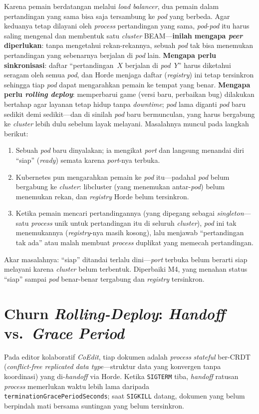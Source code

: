 Karena pemain berdatangan melalui \emph{load balancer}, dua pemain dalam pertandingan yang
sama bisa saja tersambung ke \emph{pod} yang berbeda. Agar keduanya tetap dilayani oleh
\emph{process} pertandingan yang sama, \emph{pod}-\emph{pod} itu harus saling mengenal dan
membentuk satu \emph{cluster} BEAM---\textbf{inilah mengapa \emph{peer} diperlukan}: tanpa
mengetahui rekan-rekannya, sebuah \emph{pod} tak bisa menemukan pertandingan yang sebenarnya
berjalan di \emph{pod} lain. \textbf{Mengapa perlu sinkronisasi}: daftar ``pertandingan~$X$
berjalan di \emph{pod}~$Y$'' harus diketahui seragam oleh semua \emph{pod}, dan Horde menjaga
daftar (\emph{registry}) ini tetap tersinkron sehingga tiap \emph{pod} dapat mengarahkan
pemain ke tempat yang benar. \textbf{Mengapa perlu \emph{rolling deploy}}: memperbarui game
(versi baru, perbaikan bug) dilakukan bertahap agar layanan tetap hidup tanpa
\emph{downtime}; \emph{pod} lama diganti \emph{pod} baru sedikit demi sedikit---dan di sinilah
\emph{pod} baru bermunculan, yang harus bergabung ke \emph{cluster} lebih dulu sebelum layak
melayani. Masalahnya muncul pada langkah berikut:
\begin{enumerate}[nosep,leftmargin=2em]
  \item Sebuah \emph{pod} baru dinyalakan; ia mengikat \emph{port} dan langsung menandai
        diri ``siap'' (\emph{ready}) semata karena \emph{port}-nya terbuka.
  \item Kubernetes pun mengarahkan pemain ke \emph{pod} itu---padahal \emph{pod} belum
        bergabung ke \emph{cluster}: libcluster (yang menemukan antar-\emph{pod}) belum
        menemukan rekan, dan \emph{registry} Horde belum tersinkron.
  \item Ketika pemain mencari pertandingannya (yang dipegang sebagai \emph{singleton}---satu
        \emph{process} unik untuk pertandingan itu di seluruh \emph{cluster}), \emph{pod} ini
        tak menemukannya (\emph{registry}-nya masih kosong), lalu menjawab ``pertandingan
        tak ada'' atau malah membuat \emph{process} duplikat yang memecah pertandingan.
\end{enumerate}
\noindent Akar masalahnya: ``siap'' ditandai terlalu dini---\emph{port} terbuka belum berarti
siap melayani karena \emph{cluster} belum terbentuk. Diperbaiki M4, yang menahan status
``siap'' sampai \emph{pod} benar-benar tergabung dan \emph{registry} tersinkron.

\section{Churn \emph{Rolling-Deploy}: \emph{Handoff} vs.\ \emph{Grace Period}}
\label{sec:p4}
Pada editor kolaboratif \emph{CoEdit}, tiap dokumen adalah \emph{process} \emph{stateful}
ber-CRDT (\emph{conflict-free replicated data type}---struktur data yang konvergen tanpa
koordinasi) yang di-\emph{handoff} via Horde. Ketika \texttt{SIGTERM} tiba, \emph{handoff}
ratusan \emph{process} memerlukan waktu lebih lama daripada
\texttt{terminationGracePeriodSeconds}; saat \texttt{SIGKILL} datang, dokumen yang belum
berpindah mati bersama suntingan yang belum tersinkron.

